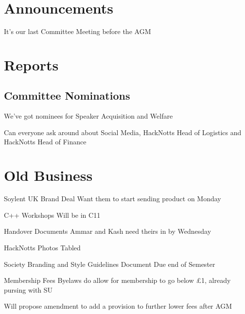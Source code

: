 \documentclass[11pt,hacksoc]{meetingmins}
\begin{document}
\maketitle

\section{Announcements}
\begin{items}
	\item
	It's our last Committee Meeting before the AGM
	
\end{items}

\section{Reports}

\subsection{Committee Nominations}
\begin{hiddensubitems}
	\item
	We've got nominees for Speaker Acquisition and Welfare
	
	\item
	Can everyone ask around about Social Media, HackNotts Head of Logistics and HackNotts Head of Finance
\end{hiddensubitems}

\section{Old Business}
\begin{items}
	\item
	Soylent UK Brand Deal
		\subitem
		Want them to start sending product on Monday
		
	\item
	C++ Workshops
		\subitem
		Will be in C11

	\item
	Handover Documents
		\subitem
		Ammar and Kash need theirs in by Wednesday
	
	\item
	HackNotts Photos
		\subitem
		Tabled
	
	\item
	Society Branding and Style Guidelines Document
		\subitem
		Due end of Semester
	
	\item
	Membership Fees
		\subitem
		Byelaws do allow for membership to go below \pounds1, already pursing with SU
		
		\subitem
		Will propose amendment to add a provision to further lower fees after AGM
\end{items}
\end{document}
